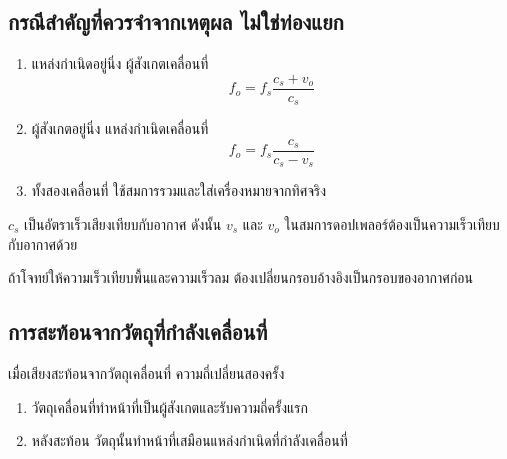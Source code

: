 \begin{center}
\end{center}

\subsection{กรณีสำคัญที่ควรจำจากเหตุผล ไม่ใช่ท่องแยก}

\begin{enumerate}
    \item แหล่งกำเนิดอยู่นิ่ง ผู้สังเกตเคลื่อนที่
    \[
    \boxed{f_o=f_s\frac{c_s+v_o}{c_s}}
    \]

    \item ผู้สังเกตอยู่นิ่ง แหล่งกำเนิดเคลื่อนที่
    \[
    \boxed{f_o=f_s\frac{c_s}{c_s-v_s}}
    \]

    \item ทั้งสองเคลื่อนที่ ใช้สมการรวมและใส่เครื่องหมายจากทิศจริง
\end{enumerate}

\begin{tcolorbox}[title={ข้อควรระวังเมื่อมีลม}]
$c_s$ เป็นอัตราเร็วเสียงเทียบกับอากาศ ดังนั้น $v_s$ และ $v_o$ ในสมการดอปเพลอร์ต้องเป็นความเร็วเทียบกับอากาศด้วย

ถ้าโจทย์ให้ความเร็วเทียบพื้นและความเร็วลม ต้องเปลี่ยนกรอบอ้างอิงเป็นกรอบของอากาศก่อน
\end{tcolorbox}

\subsection{การสะท้อนจากวัตถุที่กำลังเคลื่อนที่}

เมื่อเสียงสะท้อนจากวัตถุเคลื่อนที่ ความถี่เปลี่ยนสองครั้ง

\begin{enumerate}
    \item วัตถุเคลื่อนที่ทำหน้าที่เป็นผู้สังเกตและรับความถี่ครั้งแรก
    \item หลังสะท้อน วัตถุนั้นทำหน้าที่เสมือนแหล่งกำเนิดที่กำลังเคลื่อนที่
\end{enumerate}

